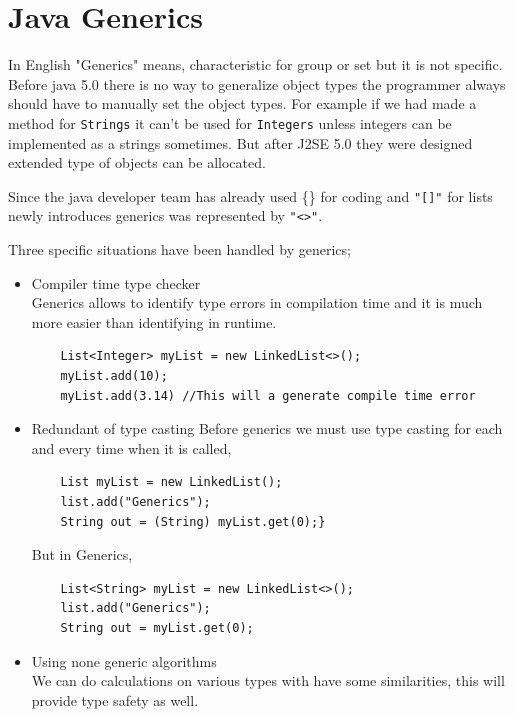 \documentclass[12pt,a4paper]{report}
\begin{document}
\section{Java Generics}

In English "Generics" means, characteristic for group or set but it is not specific. Before java 5.0 there is no way to generalize object types the programmer always should have to manually set the object types. For example if we had made a method for \texttt{Strings} it can't be used for \texttt{Integers} unless integers can be implemented as a strings sometimes. But after J2SE 5.0\cite{bradbury2006mutation} they were designed extended type of objects can be allocated.

Since the java developer team has already used \{\} for coding and \texttt{"[]"} for lists newly introduces generics was represented by \texttt{"<>"}.

Three specific situations have been handled by generics;

\begin{itemize}
\item Compiler time type checker \\
Generics allows to identify type errors in compilation time and it is much more easier than identifying in runtime. 

\begin{lstlisting}
	List<Integer> myList = new LinkedList<>();
	myList.add(10);
	myList.add(3.14) //This will a generate compile time error
\end{lstlisting}

\item Redundant of type casting
Before generics we must use type casting for each and every time when it is called, 

\begin{lstlisting}
	List myList = new LinkedList();
	list.add("Generics");
	String out = (String) myList.get(0);}
\end{lstlisting}

But in Generics,
\begin{lstlisting}
	List<String> myList = new LinkedList<>();
	list.add("Generics");
	String out = myList.get(0);
\end{lstlisting}

\item Using none generic algorithms\\

We can do calculations on various types with have some similarities, this will provide type safety as well.
\end{itemize}
\end{document}
